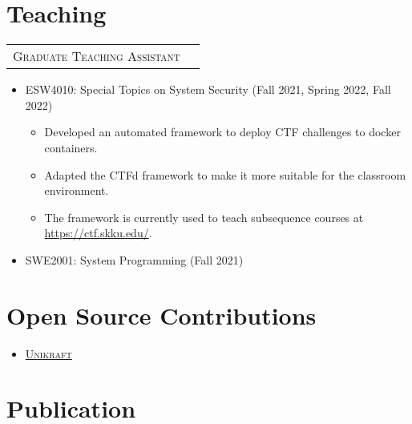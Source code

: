 \documentclass[a4paper,12pt]{article}
\begin{document}
\section{Teaching}
\begin{tabularx}{\linewidth}{@{}lX@{}}	
\textsc{Graduate Teaching Assistant} \\

\end{tabularx}
\begin{itemize}
    \item ESW4010: Special Topics on System Security (Fall 2021, Spring 2022, Fall 2022)
    \begin{itemize}
        \item Developed an automated framework to deploy CTF challenges to docker containers.
        \item Adapted the CTFd framework to make it more suitable for the classroom environment.
        \item The framework is currently used to teach subsequence courses at \url{https://ctf.skku.edu/}.
    \end{itemize}
    \item SWE2001: System Programming (Fall 2021)
\end{itemize}

\section{Open Source Contributions}

\begin{itemize}[nosep,after=\strut, leftmargin=2em, itemsep=3pt]
\item \href{https://github.com/unikraft/unikraft/commits/staging/?author=kha-dinh}{\textsc{Unikraft}}    
\end{itemize}





\section{Publication}
\begin{refsection}
\nocite{*}
\printbibliography[heading=none]
\end{refsection}
\vfill
{}
\end{document}
